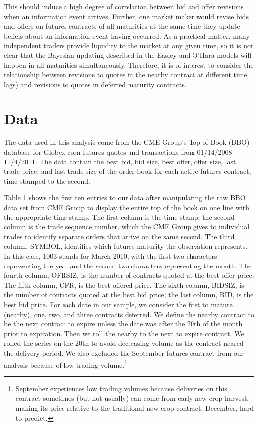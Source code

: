 \documentclass[review,12pt]{elsarticle}
\begin{document}
This should induce a high degree of correlation between bid and offer
revisions when an information event arrives. Further, one market maker
would revise bids and offers on futures contracts of all maturities at
the same time they update beliefs about an information event having
occurred. As a practical matter, many independent traders provide
liquidity to the market at any given time, so it is not clear that the
Bayesian updating described in the Easley and O'Hara models will happen
in all maturities simultaneously. Therefore, it is of interest to
consider the relationship between revisions to quotes in the nearby
contract at different time lags) and revisions to quotes in deferred
maturity contracts.

\section{Data}\label{data}

The data used in this analysis come from the CME Group's Top of Book
(BBO) database for Globex corn futures quotes and transactions from
01/14/2008-11/4/2011. The data contain the best bid, bid size, best
offer, offer size, last trade price, and last trade size of the order
book for each active futures contract, time-stamped to the second.

Table 1 shows the first ten entries to our data after manipulating the
raw BBO data set from CME Group to display the entire top of the book on
one line with the appropriate time stamp. The first column is the
time-stamp, the second column is the trade sequence number, which the
CME Group gives to individual trades to identify separate orders that
arrive on the same second. The third column, SYMBOL, identifies which
futures maturity the observation represents. In this case, 1003 stands
for March 2010, with the first two characters representing the year and
the second two characters representing the month. The fourth column,
OFRSIZ, is the number of contracts quoted at the best offer price. The
fifth column, OFR, is the best offered price. The sixth column, BIDSIZ,
is the number of contracts quoted at the best bid price; the last
column, BID, is the best bid price. For each date in our sample, we
consider the first to mature (nearby), one, two, and three contracts
deferred. We define the nearby contract to be the next contract to
expire unless the date was after the 20th of the month prior to
expiration. Then we roll the nearby to the next to expire contract. We
rolled the series on the 20th to avoid decreasing volume as the contract
neared the delivery period. We also excluded the September futures
contract from our analysis because of low trading volume.\footnote{September
  experiences low trading volumes because deliveries on this contract
  sometimes (but not usually) can come from early new crop harvest,
  making its price relative to the traditional new crop contract,
  December, hard to predict.}
\end{document}
